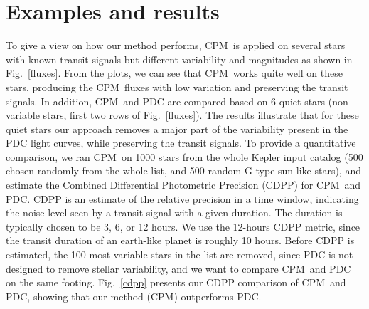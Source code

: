 \documentclass[12pt, preprint]{aastex}
\newcommand{\name}{CPM}
\begin{document}
\clearpage

\section{Examples and results}

To give a view on how our method performs, \name\ is applied on several stars with 
known transit signals but different variability and magnitudes as shown in Fig.~\ref{fluxes}. 
From the plots, we can see that \name\ works quite well on these stars, producing the \name\ fluxes 
with low variation and preserving the transit signals.
In addition, \name\ and PDC are compared based on 6 quiet stars 
(non-variable stars, first two rows of Fig.~\ref{fluxes}). 
The results illustrate that for these quiet stars our approach removes 
a major part of the variability present in the PDC light curves, while preserving the transit signals. 
To provide a quantitative comparison, we ran \name\ on 1000 stars from the whole Kepler input catalog 
(500 chosen randomly from the whole list, and 500 random G-type sun-like stars), 
and estimate the Combined Differential Photometric Precision (CDPP) for \name\ and PDC. 
CDPP is an estimate of the relative precision in a time window, 
indicating the noise level seen by a transit signal with a given duration. 
The duration is typically chosen to be 3, 6, or 12 hours. 
We use the 12-hours CDPP metric, since the transit duration of an earth-like planet is roughly 10 hours. 
Before CDPP is estimated, the 100 most variable stars in the list are removed, 
since PDC is not designed to remove stellar variability, and we want to compare \name\ and PDC on the same footing.
Fig.~\ref{cdpp} presents our CDPP comparison of \name\ and PDC, showing that our method (\name) outperforms PDC. 
\end{document}
